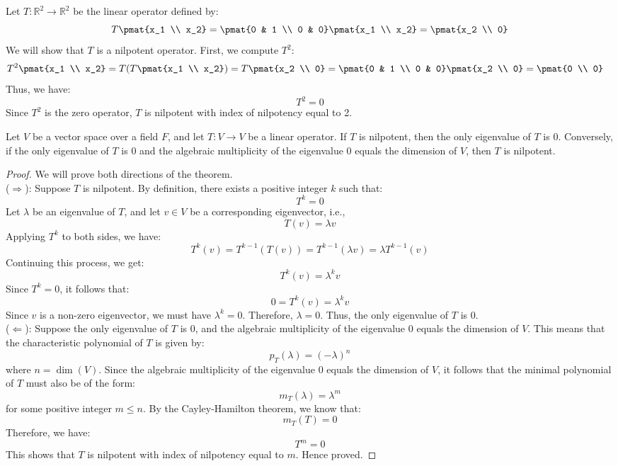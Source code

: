 \documentclass[openany]{book}
\begin{document}
\begin{example}
    Let $T: \mathbb{R}^2 \to \mathbb{R}^2$ be the linear operator defined by:
    $$T\pmat{x_1 \\ x_2} = \pmat{0 & 1 \\ 0 & 0}\pmat{x_1 \\ x_2} = \pmat{x_2 \\ 0}$$
    We will show that $T$ is a nilpotent operator. First, we compute $T^2$:
    \[
    \begin{aligned}
    T^2\pmat{x_1 \\ x_2} &= T(T\pmat{x_1 \\ x_2}) = T\pmat{x_2 \\ 0} = \pmat{0 & 1 \\ 0 & 0}\pmat{x_2 \\ 0} = \pmat{0 \\ 0}
    \end{aligned}
    \]
    Thus, we have:
    $$T^2 = 0$$
    Since $T^2$ is the zero operator, $T$ is nilpotent with index of nilpotency equal to 2.
\end{example}
\begin{mytheorem}
    Let $V$ be a vector space over a field $F$, and let $T: V \to V$ be a linear operator. If $T$ is nilpotent, then the only eigenvalue of $T$ is $0$. Conversely, if the only eigenvalue of $T$ is $0$ and the algebraic multiplicity of the eigenvalue $0$ equals the dimension of $V$, then $T$ is nilpotent.
\end{mytheorem}
\begin{proof}
    We will prove both directions of the theorem. \\
    ($\Rightarrow$): Suppose $T$ is nilpotent. By definition, there exists a positive integer $k$ such that:
    $$T^k = 0$$
    Let $\lambda$ be an eigenvalue of $T$, and let $v \in V$ be a corresponding eigenvector, i.e., 
    $$T(v) = \lambda v$$
    Applying $T^k$ to both sides, we have:
    $$T^k(v) = T^{k-1}(T(v)) = T^{k-1}(\lambda v) = \lambda T^{k-1}(v)$$
    Continuing this process, we get:
    $$T^k(v) = \lambda^k v$$
    Since $T^k = 0$, it follows that:
    $$0 = T^k(v) = \lambda^k v$$
    Since $v$ is a non-zero eigenvector, we must have $\lambda^k = 0$. Therefore, $\lambda = 0$. Thus, the only eigenvalue of $T$ is $0$. \\
    ($\Leftarrow$): Suppose the only eigenvalue of $T$ is $0$, and the algebraic multiplicity of the eigenvalue $0$ equals the dimension of $V$. This means that the characteristic polynomial of $T$ is given by:
    $$p_T(\lambda) = (-\lambda)^n$$
    where $n = \dim(V)$. Since the algebraic multiplicity of the eigenvalue $0$ equals the dimension of $V$, it follows that the minimal polynomial of $T$ must also be of the form:
    $$m_T(\lambda) = \lambda^m$$
    for some positive integer $m \leq n$. By the Cayley-Hamilton theorem, we know that:
    $$m_T(T) = 0$$
    Therefore, we have:
    $$T^m = 0$$
    This shows that $T$ is nilpotent with index of nilpotency equal to $m$. Hence proved.
\end{proof}
\end{document}
